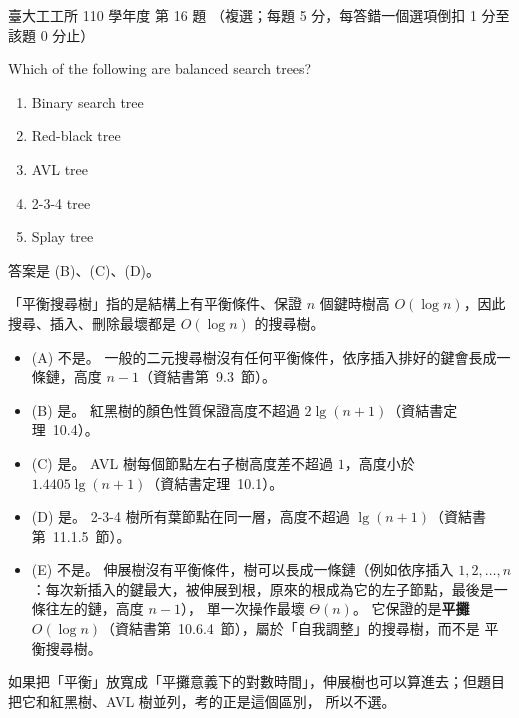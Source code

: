 \begin{pastexam}[label={px:ntu-110-ie-ds-16}]{臺大工工所 110 學年度 第 16 題}
（複選；每題 5 分，每答錯一個選項倒扣 1 分至該題 0 分止）

Which of the following are balanced search trees?
\begin{enumerate}[label=(\Alph*)]
\item Binary search tree
\item Red-black tree
\item AVL tree
\item 2-3-4 tree
\item Splay tree
\end{enumerate}
\end{pastexam}

\begin{pastsoln}
答案是 (B)、(C)、(D)。

「平衡搜尋樹」指的是結構上有平衡條件、保證 $n$ 個鍵時樹高 $O(\log n)$，因此搜尋、插入、刪除最壞都是 $O(\log n)$ 的搜尋樹。
\begin{itemize}
\item (A) 不是。 一般的二元搜尋樹沒有任何平衡條件，依序插入排好的鍵會長成一條鏈，高度 $n - 1$（資結書第~9.3~節）。
\item (B) 是。 紅黑樹的顏色性質保證高度不超過 $2\lg(n + 1)$（資結書定理~10.4）。
\item (C) 是。 AVL 樹每個節點左右子樹高度差不超過 $1$，高度小於 $1.4405\lg(n + 1)$（資結書定理~10.1）。
\item (D) 是。 2-3-4 樹所有葉節點在同一層，高度不超過 $\lg(n + 1)$（資結書第~11.1.5~節）。
\item (E) 不是。 伸展樹沒有平衡條件，樹可以長成一條鏈（例如依序插入 $1, 2, \ldots, n$：每次新插入的鍵最大，被伸展到根，原來的根成為它的左子節點，最後是一條往左的鏈，高度 $n - 1$），
單一次操作最壞 $\Theta(n)$。 它保證的是\textbf{平攤} $O(\log n)$（資結書第~10.6.4~節），屬於「自我調整」的搜尋樹，而不是
平衡搜尋樹。
\end{itemize}
如果把「平衡」放寬成「平攤意義下的對數時間」，伸展樹也可以算進去；但題目把它和紅黑樹、AVL 樹並列，考的正是這個區別，
所以不選。
\end{pastsoln}
